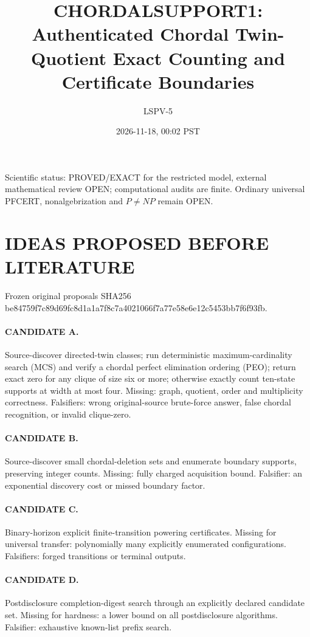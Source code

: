 \documentclass[11pt]{article}
\title{CHORDALSUPPORT1: Authenticated Chordal Twin-Quotient Exact Counting and Certificate Boundaries}
\author{LSPV-5}
\date{2026-11-18, 00:02 PST}
\begin{document}
\maketitle
\noindent Scientific status: PROVED/EXACT for the restricted model, external mathematical review OPEN; computational audits are finite. Ordinary universal PFCERT, nonalgebrization and $P\ne NP$ remain OPEN.
\section{IDEAS PROPOSED BEFORE LITERATURE}
Frozen original proposals SHA256 be84759f7c89d69fc8d1a1a7f8c7a4021066f7a77e58e6e12c5453bb7f6f93fb.
\paragraph{CANDIDATE A.} Source-discover directed-twin classes; run deterministic maximum-cardinality search (MCS) and verify a chordal perfect elimination ordering (PEO); return exact zero for any clique of size six or more; otherwise exactly count ten-state supports at width at most four. Missing: graph, quotient, order and multiplicity correctness. Falsifiers: wrong original-source brute-force answer, false chordal recognition, or invalid clique-zero.
\paragraph{CANDIDATE B.} Source-discover small chordal-deletion sets and enumerate boundary supports, preserving integer counts. Missing: fully charged acquisition bound. Falsifier: an exponential discovery cost or missed boundary factor.
\paragraph{CANDIDATE C.} Binary-horizon explicit finite-transition powering certificates. Missing for universal transfer: polynomially many explicitly enumerated configurations. Falsifiers: forged transitions or terminal outputs.
\paragraph{CANDIDATE D.} Postdisclosure completion-digest search through an explicitly declared candidate set. Missing for hardness: a lower bound on all postdisclosure algorithms. Falsifier: exhaustive known-list prefix search.
\end{document}
